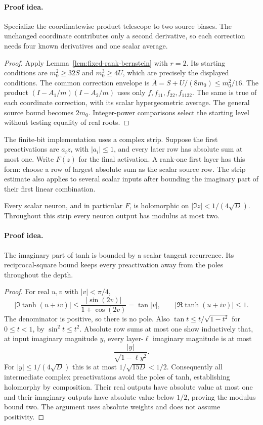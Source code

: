 \paragraph{Proof idea.}
Specialize the coordinatewise product telescope to two source biases. The
unchanged coordinate contributes only a second derivative, so each
correction needs four known derivatives and one scalar average.

\begin{proof}
Apply Lemma~\ref{lem:fixed-rank-bernstein} with $r=2$. Its
starting conditions are $m_0^2\ge32S$ and $m_0^3\ge4U$,
which are precisely the displayed conditions. The common correction
envelope is $\overline A=S+U/(8m_0)\le m_0^2/16$.
The product $(I-A_1/m)(I-A_2/m)$ uses only
$f,f_{11},f_{22},f_{1122}$. The same is true of each coordinate
correction, with its scalar hypergeometric average. The general
source bound becomes $2m_0$. Integer-power comparisons select the
starting level without testing equality of real roots.
\end{proof}

The finite-bit implementation uses a complex strip. Suppose the
first preactivations are $a_iz$, with $|a_i|\le1$, and every later
row has absolute sum at most one. Write $F(z)$ for the final
activation. A rank-one first layer has this form: choose a row of
largest absolute sum as the scalar source row. The strip estimate
also applies to several scalar inputs after bounding the imaginary
part of their first linear combination.

\begin{lemma}
\label{lem:signedstrip}\label{sec:signed-bottleneck}
Every scalar neuron, and in particular $F$, is holomorphic on
$|\Im z|<1/(4\sqrt D)$. Throughout this strip every neuron output
has modulus at most two.
\end{lemma}
\paragraph{Proof idea.}
The imaginary part of tanh is bounded by a scalar tangent recurrence. Its
reciprocal-square bound keeps every preactivation away from the poles
throughout the depth.

\begin{proof}
For real $u,v$ with $|v|<\pi/4$,
\[
 |\Im\tanh(u+iv)|
 \le\frac{|\sin(2v)|}{1+\cos(2v)}=\tan|v|,
 \qquad |\Re\tanh(u+iv)|\le1.
\]
The denominator is positive, so there is no pole.
Also $\tan t\le t/\sqrt{1-t^2}$ for $0\le t<1$, by
$\sin^2t\le t^2$. Absolute row sums at most one show inductively
that, at input imaginary magnitude $y$, every layer-$\ell$
imaginary magnitude is at most
\[
 \frac{|y|}{\sqrt{1-\ell y^2}}.
\]
For $|y|\le1/(4\sqrt D)$ this is at most $1/\sqrt{15D}<1/2$.
Consequently all intermediate complex preactivations avoid the
poles of tanh, establishing holomorphy by composition. Their real
outputs have absolute value at most one and their imaginary outputs
have absolute value below $1/2$, proving the modulus bound two.
The argument uses absolute weights and does not assume positivity.
\end{proof}

